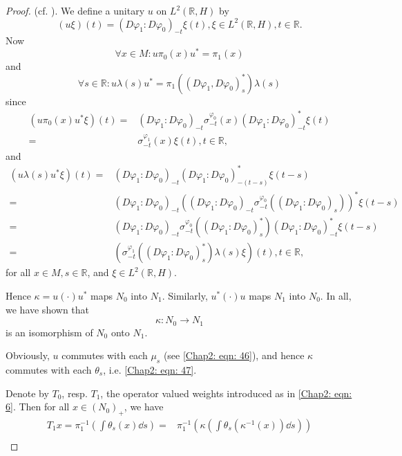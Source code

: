 \begin{proof}
    (cf. \cite[Proposition 3.5]{18}). We define a unitary $u$ on $L^2(\mathbb{R},H)$ by
    \[
        (u\xi)(t)=(D\varphi_1:D\varphi_0)_{-t}\xi(t),\xi\in L^2(\mathbb{R},H), t\in \mathbb{R}.
    \]
    Now
    \begin{equation}
        \forall x\in M: u\pi_0(x)u^*=\pi_1(x)
    \end{equation}
    and
    \begin{equation}
        \forall s\in \mathbb{R}:u\lambda(s)u^*=\pi_1((D\varphi_1,D\varphi_0)_s^*)\lambda(s)
    \end{equation}
    since
    \[
        \begin{split}
            (u\pi_0(x)u^*\xi)(t)=&(D\varphi_1:D\varphi_0)_{-t}\sigma_{-t}^{\varphi_0}(x)(D\varphi_1:D\varphi_0)_{-t}^*\xi(t)\\
            =&\sigma_{-t}^{\varphi_1}(x)\xi(t),t\in \mathbb{R},
        \end{split}
    \]
    and
    \[
        \begin{split}
            (u\lambda(s)u^* \xi)(t)=&(D\varphi_1:D\varphi_0)_{-t}(D\varphi_1:D\varphi_0)_{-(t-s)}^*\xi(t-s)\\
            =&(D\varphi_1:D\varphi_0)_{-t}((D\varphi_1:D\varphi_0)_{-t}\sigma_{-t}^{\varphi_0}((D\varphi_1:D\varphi_0)_{s}))^*\xi(t-s)\\
            =&(D\varphi_1:D\varphi_0)_{-t}\sigma_{-t}^{\varphi_0}((D\varphi_1:D\varphi_0)_{s}^*)(D\varphi_1:D\varphi_0)_{-t}^*\xi(t-s)\\
            =&(\sigma_{-t}^{\varphi_1}((D\varphi_1:D\varphi_0)_{s}^*)\lambda(s)\xi)(t),t\in \mathbb{R},
        \end{split}
    \]
    for all $x\in M,s\in \mathbb{R}$, and $\xi\in L^2(\mathbb{R},H)$.\par
    Hence $\kappa=u(\cdot)u^*$ maps $N_0$ into $N_1$. Similarly, $u^*(\cdot)u$ maps $N_1$ into $N_0$. In all, we have shown that
    \[
        \kappa:N_0\to N_1
    \]
    {\color{red} is} an isomorphism of $N_0$ onto $N_1$.\par
    Obviously, $u$ commutes with each $\mu_s$ (see \eqref{Chap2: eqn: 46}), and hence $\kappa$ commutes with each $\theta_s$, i.e. \eqref{Chap2: eqn: 47}.\par
    Denote by $T_0$, resp. $T_1$, the operator valued weights introduced as in \eqref{Chap2: eqn: 6}. Then for all $x\in(N_0)_+$, we have
    \[
        \begin{split}
            T_1x=\pi_1^{-1}(\int \theta_s(x)\dd s)=&\pi_1^{-1}(\kappa(\int \theta_s (\kappa^{-1}(x))\dd s))\\

\end{split}\]
\end{proof}
